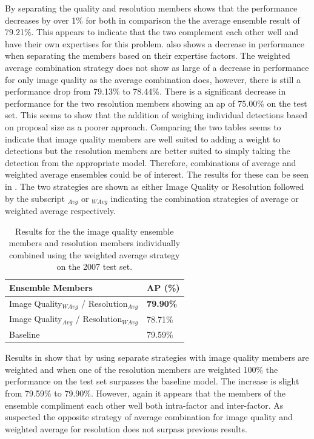 By separating the quality and resolution members  shows that the performance decreases by over 1\% for both in comparison the the average ensemble result of 79.21\%. This appears to indicate that the two complement each other well and have their own expertises for this problem.  also shows a decrease in performance when separating the members based on their expertise factors. The weighted average combination strategy does not show as large of a decrease in performance for only image quality as the average combination does, however, there is still a performance drop from 79.13\% to 78.44\%. There is a significant decrease in performance for the two resolution members showing an \gls{ap} of 75.00\% on the test set. This seems to show that the addition of weighing individual detections based on proposal size as a poorer approach. Comparing the two tables seems to indicate that image quality members are well suited to adding a weight to detections but the resolution members are better suited to simply taking the detection from the appropriate model. Therefore, combinations of average and weighted average ensembles could be of interest. The results for these can be seen in . The two strategies are shown as either Image Quality or Resolution followed by the subscript $_{Avg}$ or $_{WAvg}$ indicating the combination strategies of average or weighted average respectively. 

\begin{table}[h]
\centering
\caption{Results for the the image quality ensemble members and resolution members individually combined using the weighted average strategy on the 2007 test set.}
\label{tab:weandavgres}
\begin{tabular}{|l|l|}
\hline
\textbf{Ensemble Members}                  & \textbf{AP (\%)} \\ \hline
Image Quality$_{WAvg}$ / Resolution$_{Avg}$ & \textbf{79.90\%} \\ \hline
Image Quality$_{Avg}$ / Resolution$_{WAvg}$ & 78.71\% \\ \hline
Baseline                          & 79.59\% \\ \hline
\end{tabular}
\end{table}

Results in  show that by using separate strategies with image quality members are weighted and when one of the resolution members are weighted 100\% the performance on the test set surpasses the baseline model. The increase is slight from 79.59\% to 79.90\%. However, again it appears that the members of the ensemble compliment each other well both intra-factor and inter-factor. As suspected the opposite strategy of average combination for image quality and weighted average for resolution does not surpass previous results. 

